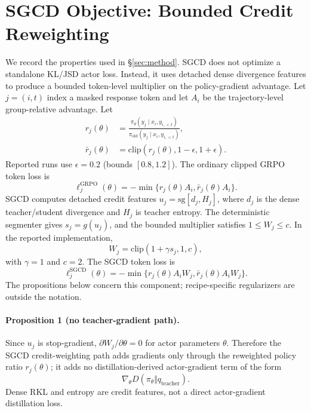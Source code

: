\providecommand{\venuecompacttablefont}{\scriptsize}
\appendix

\section{SGCD Objective: Bounded Credit Reweighting}
\label{sec:theory}

We record the properties used in \S\ref{sec:method}. SGCD does not optimize a
standalone KL/JSD actor loss. Instead, it uses detached dense divergence
features to produce a bounded token-level multiplier on the policy-gradient
advantage. Let $j=(i,t)$ index a masked response token and let $A_i$ be the
trajectory-level group-relative advantage. Let
\[
  \begin{aligned}
  r_j(\theta)
  &=
  \frac{\pi_\theta(y_j\mid x_i,y_{i,<t})}
       {\pi_{\mathrm{old}}(y_j\mid x_i,y_{i,<t})},\\
  \bar r_j(\theta)
  &=
  \mathrm{clip}(r_j(\theta),1-\epsilon,1+\epsilon).
  \end{aligned}
\]
Reported runs use $\epsilon{=}0.2$ (bounds $[0.8,1.2]$).
The ordinary clipped GRPO token loss is
\[
  \ell_j^{\mathrm{GRPO}}(\theta)
  =
  -\min\{r_j(\theta)A_i,\bar r_j(\theta)A_i\}.
\]
SGCD computes detached credit features $u_j=\mathrm{sg}[d_j,H_j]$, where
$d_j$ is the dense teacher/student divergence and $H_j$ is teacher entropy.
The deterministic segmenter gives $s_j=g(u_j)$, and the bounded multiplier
satisfies $1\le W_j\le c$. In the reported implementation,
\[
  W_j=\mathrm{clip}(1+\gamma s_j,1,c),
\]
with $\gamma{=}1$ and $c{=}2$. The SGCD token loss is
\[
  \ell_j^{\mathrm{SGCD}}(\theta)
  =
  -\min\{r_j(\theta)A_iW_j,\bar r_j(\theta)A_iW_j\}.
\]
The propositions below concern this component; recipe-specific regularizers are
outside the notation.

\paragraph{Proposition 1 (no teacher-gradient path).}
Since $u_j$ is stop-gradient, $\partial W_j/\partial\theta=0$ for actor
parameters $\theta$. Therefore the SGCD credit-weighting path adds gradients
only through the reweighted policy ratio $r_j(\theta)$; it adds no
distillation-derived actor-gradient term of the form
\[
  \nabla_\theta D(\pi_\theta\Vert q_{\mathrm{teacher}}).
\]
Dense RKL and entropy are credit features, not a direct actor-gradient
distillation loss.

